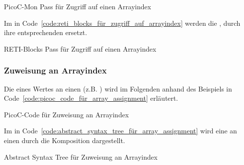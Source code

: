 \begin{code}
  \centering
  \caption{PicoC-Mon Pass für Zugriff auf einen Arrayindex}
  \label{code:picoc_mon_für_zugriff_auf_arrayindex}
\end{code}

Im  in Code~\ref{code:reti_blocks_für_zugriff_auf_arrayindex} werden die  ,  durch ihre entsprechenden  ersetzt.

\begin{code}
  \centering
  \caption{RETI-Blocks Pass für Zugriff auf einen Arrayindex}
  \label{code:reti_blocks_für_zugriff_auf_arrayindex}
\end{code}

\subsubsection{Zuweisung an Arrayindex}
\label{sec:zuweisung_an_arrayindex}

Die  eines Wertes an einen  (z.B. ) wird im Folgenden anhand des Beispiels in Code~\ref{code:picoc_code_für_array_assignment} erläutert.

\begin{code}
  \centering
  \caption{PicoC-Code für Zuweisung an Arrayindex}
  \label{code:picoc_code_für_array_assignment}
\end{code}

Im  in Code~\ref{code:abstract_syntax_tree_für_array_assignment} wird eine  an einen   durch die Komposition  dargestellt.

\begin{code}
  \centering
  \caption{Abstract Syntax Tree für Zuweisung an Arrayindex}
  \label{code:abstract_syntax_tree_für_array_assignment}
\end{code}

